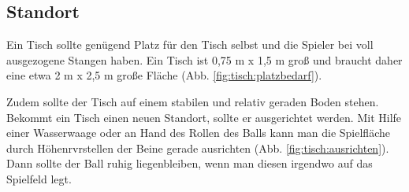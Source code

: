 \subsection{Standort}
\label{tisch:tisch:standort}




Ein Tisch sollte genügend Platz für den Tisch selbst und die Spieler bei voll ausgezogene Stangen haben. Ein Tisch ist  0,75 m x 1,5 m groß und braucht daher eine etwa 2 m x 2,5 m große Fläche (Abb. \ref{fig:tisch:platzbedarf}).

Zudem sollte der Tisch auf einem stabilen und relativ geraden Boden stehen. Bekommt ein Tisch einen neuen Standort, sollte er ausgerichtet werden. Mit Hilfe einer Wasserwaage oder an Hand des Rollen des Balls kann man die Spielfläche durch Höhenrvrstellen der Beine gerade ausrichten (Abb. \ref{fig:tisch:ausrichten}). Dann sollte der Ball ruhig liegenbleiben, wenn man diesen irgendwo auf das Spielfeld legt.

